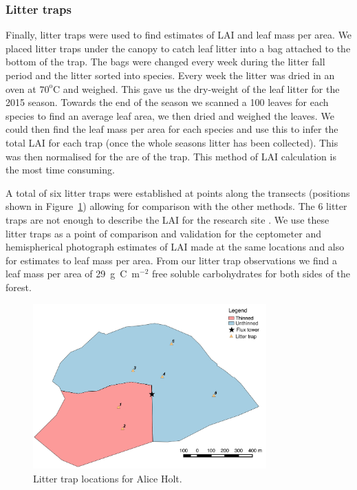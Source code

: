 \subsubsection{Litter traps}

Finally, litter traps were used to find estimates of LAI and leaf mass per area. We placed litter traps under the canopy to catch leaf litter into a bag attached to the bottom of the trap. The bags were changed every week during the litter fall period and the litter sorted into species. Every week the litter was dried in an oven at $70^{\text{o}}\text{C}$ and weighed. This gave us the dry-weight of the leaf litter for the 2015 season. Towards the end of the season we scanned a 100 leaves for each species to find an average leaf area, we then dried and weighed the leaves. We could then find the leaf mass per area for each species and use this to infer the total LAI for each trap (once the whole seasons litter has been collected). This was then normalised for the are of the trap. This method of LAI calculation is the most time consuming.  

A total of six litter traps were established at points along the transects (positions shown in Figure~\ref{chap4:fig:lit_traps}) allowing for comparison with the other methods. The 6 litter traps are not enough to describe the LAI for the research site \citep{kimmins1973some}. We use these litter traps as a point of comparison and validation for the ceptometer and hemispherical photograph estimates of LAI made at the same locations and also for estimates to leaf mass per area. From our litter trap observations we find a leaf mass per area of 29~g~C~m\(^{-2}\) free soluble carbohydrates for both sides of the forest.

\begin{figure}[ht]
    \centering
    \includegraphics[width=0.8\textwidth]{chapter/chapter4/litter_trap.pdf}
    \caption{Litter trap locations for Alice Holt.} \label{chap4:fig:lit_traps}
\end{figure}


